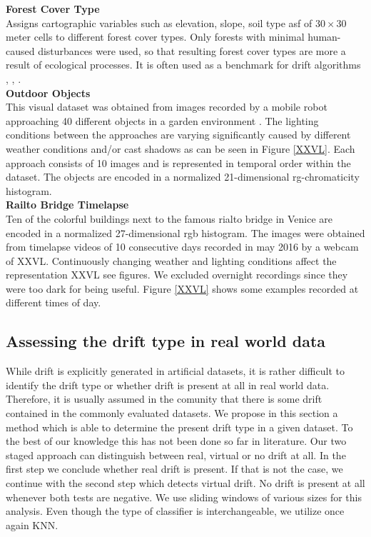 \documentclass[conference]{IEEEtran}
\begin{document}
\textbf{Forest Cover Type}\\
Assigns cartographic variables such as elevation, slope, soil type asf of $30 \times 30$ meter cells to different forest cover types. 
Only forests with minimal human-caused disturbances were used, so that resulting forest cover types are more a result of ecological processes.
It is often used as a benchmark for drift algorithms \cite{Bifet:2013:EDS:2480362.2480516}, \cite{gama2003accurate}, \cite{oza2001experimental}.\\
\textbf{Outdoor Objects}\\
This visual dataset was obtained from images recorded by a mobile robot approaching 40 different objects in a garden environment \cite{losing2015interactive}. The lighting conditions between 
the approaches are varying significantly caused by different weather conditions and/or cast shadows as can be seen in Figure \ref{XXVL}.
Each approach consists of 10 images and is represented in temporal order within the dataset. The objects are encoded in a normalized 21-dimensional rg-chromaticity histogram.\\
\textbf{Railto Bridge Timelapse}\\
Ten of the colorful buildings next to the famous rialto bridge in Venice are encoded in a normalized 27-dimensional rgb histogram. 
The images were obtained from timelapse videos of 10 consecutive days recorded in may 2016 by a webcam of XXVL. 
Continuously changing weather and lighting conditions affect the representation  XXVL see figures. We excluded overnight recordings since they were too dark for being useful.
Figure \ref{XXVL} shows some examples recorded at different times of day.
\subsection{Assessing the drift type in real world data}\label{driftType}
While drift is explicitly generated in artificial datasets, it is rather difficult to identify the drift type or whether drift is present at all in real world data. Therefore, it is usually
assumed in the comunity that there is some drift contained in the commonly evaluated datasets. We propose in this section a method which is able to determine the present drift type in a 
given dataset. To the best of our knowledge this has not been done so far in literature. Our two staged approach can distinguish between real, virtual or no drift at all. 
In the first step we conclude whether real drift is present. If that is not the case, we continue with the second step which detects virtual drift. 
No drift is present at all whenever both tests are negative. We use sliding windows of various sizes for this analysis. 
Even though the type of classifier is interchangeable, we utilize once again KNN.\\
\end{document}
